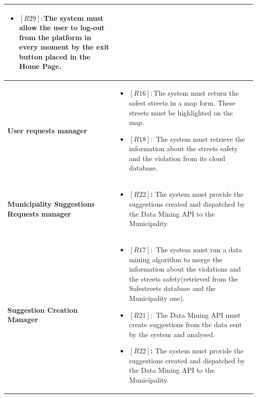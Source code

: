 \documentclass[titlepage]{article}
\begin{document}
\begin{longtable}{| p{4 cm} | p{11.5 cm} |}
\begin{itemize}
		 \item \textbf{$[R29]:$}The system must allow the user to log-out from the platform in every moment by the exit button placed in the Home Page. 
	\end{itemize} \\ \hline
		\newline \textbf {User requests manager} &
		\begin{itemize}
			\item \textbf{$[R16]:$}The system must return the safest streets in a map form. These streets must be highlighted on the map.
			\item \textbf{$[R18]:$} The system must retrieve the information about the streets
safety and the violation from its cloud database.
		\end{itemize} \\ \hline
		\newline \textbf {Municipality Suggestions Requests manager} &
		\begin{itemize}
			\item \textbf{$[R22]$:} The system must provide the suggestions created and dispatched
by the Data Mining API to the Municipality.
		\end{itemize} \\ \hline
		\newline \textbf {Suggestion Creation Manager} &
		\begin{itemize}
			\item \textbf{$[R17]:$} The system must run a data mining algorithm to merge the information about the violations and the streets safety(retrieved from the Safestreets database and the Municipality one).
			 \item \textbf{$[R21]:$} The Data Mining API must create suggestions from the data sent by the system and analysed.
			 \item \textbf{$[R22]$:} The system must provide the suggestions created and dispatched
by the Data Mining API to the Municipality.
			 

\end{itemize}
\end{longtable}
\end{document}
